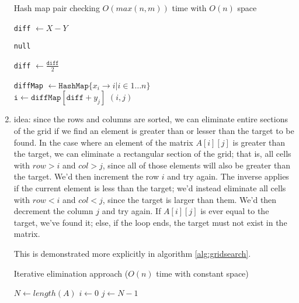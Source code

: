 \documentclass[12pt]{article}
\begin{document}
\begin{enumerate}
    \begin{algorithm}
        \caption{Hash map pair checking $O(max(n, m))$ time with $O(n)$ space}
        \begin{algorithmic}
            \State \texttt{diff} $\gets X - Y$

                \State \Return \texttt{null}
            \EndIf

            \State \texttt{diff} $\gets \frac{\texttt{diff}}{2}$

            \State \texttt{diffMap} $ \gets \texttt{HashMap}\{x_i \rightarrow i | i \in 1 \dots n\}$\\

                    \State $\texttt{i} \gets \texttt{diffMap}[\texttt{diff} + y_j]$
                    \State \Return $(i, j)$
                \EndIf
            \EndFor
        \end{algorithmic}
    \end{algorithm}

    \item idea: since the rows and columns are sorted, we can eliminate entire sections of the grid if we find an element 
    is greater than or lesser than the target to be found. In the case where an element of the matrix $A[i][j]$ is greater 
    than the target, we can eliminate a rectangular section of the grid; that is, all cells with $row > i$ and $col > j$, since 
    all of those elements will also be greater than the target. We'd then increment the row $i$ and try again. The inverse 
    applies if the current element is less than the target; we'd instead eliminate all cells with $row < i$ and $col < j$, 
    since the target is larger than them. We'd then decrement the column $j$ and try again. If $A[i][j]$ is ever equal to 
    the target, we've found it; else, if the loop ends, the target must not exist in the matrix.
    
    This is demonstrated more explicitly in algorithm \ref{alg:gridsearch}.
    
    \begin{algorithm}
        \caption{Iterative elimination approach ($O(n)$ time with constant space)}\label{alg:gridsearch}
        \begin{algorithmic}
            \State $N \gets length(A)$
            \State $i \gets 0$
            \State $j \gets N - 1$
            

\end{algorithmic}
\end{algorithm}
\end{enumerate}
\end{document}
